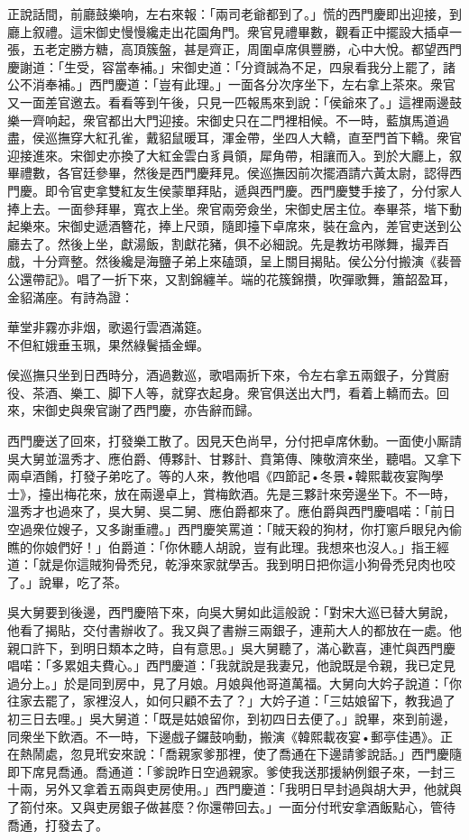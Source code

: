 正說話間，前廳鼓樂响，左右來報：「兩司老爺都到了。」慌的西門慶即出迎接，到廳上叙禮。這宋御史慢慢纔走出花園角門。衆官見禮畢數，觀看正中擺設大插卓一張，五老定勝方糖，高頂簇盤，甚是齊正，周圍卓席俱豐勝，心中大悅。都望西門慶謝道：「生受，容當奉補。」宋御史道：「分資誠為不足，四泉看我分上罷了，諸公不消奉補。」西門慶道：「豈有此理。」一面各分次序坐下，左右拿上茶來。衆官又一面差官邀去。看看等到午後，只見一匹報馬來到說：「侯爺來了。」這裡兩邊鼓樂一齊响起，衆官都出大門迎接。宋御史只在二門裡相候。不一時，藍旗馬道過盡，侯巡撫穿大紅孔雀，戴貂鼠暖耳，渾金帶，坐四人大轎，直至門首下轎。衆官迎接進來。宋御史亦換了大紅金雲白豸員領，犀角帶，相讓而入。到於大廳上，叙畢禮數，各官廷參畢，然後是西門慶拜見。侯巡撫因前次擺酒請六黃太尉，認得西門慶。即令官吏拿雙紅友生侯蒙單拜貼，遞與西門慶。西門慶雙手接了，分付家人捧上去。一面參拜畢，寬衣上坐。衆官兩旁僉坐，宋御史居主位。奉畢茶，堦下動起樂來。宋御史遞酒簪花，捧上尺頭，隨即擡下卓席來，裝在盒內，差官吏送到公廳去了。然後上坐，獻湯飯，割獻花豬，俱不必細說。先是教坊弔隊舞，撮弄百戲，十分齊整。然後纔是海鹽子弟上來磕頭，呈上關目揭貼。侯公分付搬演《裴晉公還帶記》。唱了一折下來，又割錦纏羊。端的花簇錦攢，吹彈歌舞，簫韶盈耳，金貂滿座。{}有詩為證：

\begin{myquote} 
華堂非霧亦非烟，歌遏行雲酒滿筵。\\不但紅娥垂玉珮，果然綠鬢插金蟬。
\end{myquote} 

侯巡撫只坐到日西時分，酒過數巡，歌唱兩折下來，令左右拿五兩銀子，分賞廚役、茶酒、樂工、脚下人等，就穿衣起身。衆官俱送出大門，看着上轎而去。回來，宋御史與衆官謝了西門慶，亦告辭而歸。

西門慶送了回來，打發樂工散了。因見天色尚早，分付把卓席休動。一面使小厮請吳大舅並溫秀才、應伯爵、傅夥計、甘夥計、賁第傳、陳敬濟來坐，聽唱。又拿下兩卓酒餚，打發子弟吃了。等的人來，教他唱《四節記•冬景•韓熙載夜宴陶學士》，擡出梅花來，放在兩邊卓上，賞梅飲酒。先是三夥計來旁邊坐下。不一時，溫秀才也過來了，吳大舅、吳二舅、應伯爵都來了。應伯爵與西門慶唱喏：「前日空過衆位嫂子，又多謝重禮。」西門慶笑罵道：「賊天殺的狗材，你打窻戶眼兒內偷瞧的你娘們好！」{}伯爵道：「你休聽人胡說，豈有此理。我想來也沒人。」{}指王經道：「就是你這賊狗骨禿兒，乾淨來家就學舌。我到明日把你這小狗骨禿兒肉也咬了。」說畢，吃了茶。

吳大舅要到後邊，西門慶陪下來，向吳大舅如此這般說：「對宋大巡已替大舅說，他看了揭貼，交付書辦收了。我又與了書辦三兩銀子，連荊大人的都放在一處。他親口許下，到明日類本之時，自有意思。」吳大舅聽了，滿心歡喜，連忙與西門慶唱喏：「多累姐夫費心。」西門慶道：「我就說是我妻兄，他說既是令親，我已定見過分上。」於是同到房中，見了月娘。月娘與他哥道萬福。大舅向大妗子說道：「你往家去罷了，家裡沒人，如何只顧不去了？」大妗子道：「三姑娘留下，教我過了初三日去哩。」吳大舅道：「既是姑娘留你，到初四日去便了。」說畢，來到前邊，同衆坐下飲酒。不一時，下邊戲子鑼鼓响動，搬演《韓熙載夜宴•郵亭佳遇》。正在熱鬧處，忽見玳安來說：「喬親家爹那裡，使了喬通在下邊請爹說話。」西門慶隨即下席見喬通。喬通道：「爹說昨日空過親家。爹使我送那援納例銀子來，一封三十兩，另外又拿着五兩與吏房使用。」西門慶道：「我明日早封過與胡大尹，他就與了箚付來。又與吏房銀子做甚麼？你還帶回去。」一面分付玳安拿酒飯點心，管待喬通，打發去了。

